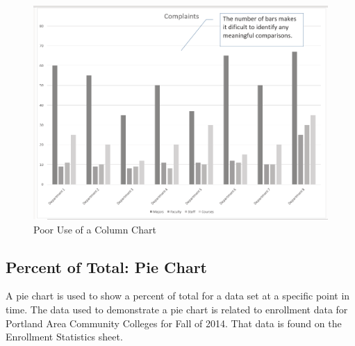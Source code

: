 \begin{figure}[H]
	\centering
	\includegraphics[width=\maxwidth{.95\linewidth}]{gfx/ch04_fig19}
	\caption{Poor Use of a Column Chart}
	\label{04:fig19}
\end{figure}

\subsection{Percent of Total: Pie Chart}

A pie chart is used to show a percent of total for a data set at a specific point in time. The data used to demonstrate a pie chart is related to enrollment data for Portland Area Community Colleges for Fall of 2014. That data is found on the Enrollment Statistics sheet.

